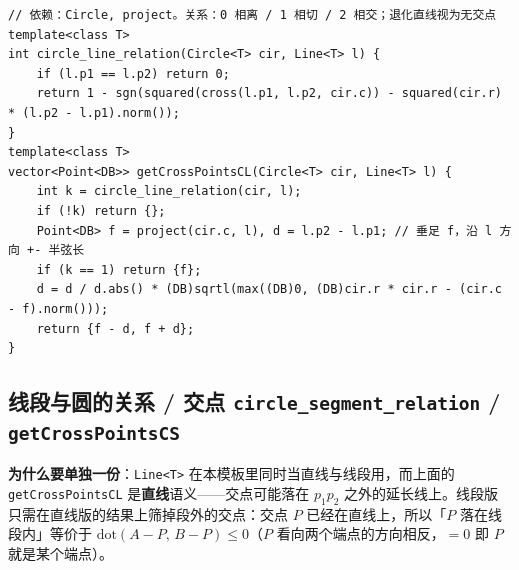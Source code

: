 \begin{verbatim}
// 依赖：Circle, project。关系：0 相离 / 1 相切 / 2 相交；退化直线视为无交点
template<class T>
int circle_line_relation(Circle<T> cir, Line<T> l) {
	if (l.p1 == l.p2) return 0;
	return 1 - sgn(squared(cross(l.p1, l.p2, cir.c)) - squared(cir.r) * (l.p2 - l.p1).norm());
}
template<class T>
vector<Point<DB>> getCrossPointsCL(Circle<T> cir, Line<T> l) {
	int k = circle_line_relation(cir, l);
	if (!k) return {};
	Point<DB> f = project(cir.c, l), d = l.p2 - l.p1; // 垂足 f，沿 l 方向 +- 半弦长
	if (k == 1) return {f};
	d = d / d.abs() * (DB)sqrtl(max((DB)0, (DB)cir.r * cir.r - (cir.c - f).norm()));
	return {f - d, f + d};
}
\end{verbatim}

		\subsection{线段与圆的关系 / 交点 \texttt{circle\_segment\_relation} / \texttt{getCrossPointsCS}}

		\textbf{为什么要单独一份}：\texttt{Line<T>} 在本模板里同时当直线与线段用，而上面的 \texttt{getCrossPointsCL} 是\textbf{直线}语义——交点可能落在 $p_1 p_2$ 之外的延长线上。线段版只需在直线版的结果上筛掉段外的交点：交点 $P$ 已经在直线上，所以「$P$ 落在线段内」等价于 $\mathrm{dot}(A - P,\, B - P) \le 0$（$P$ 看向两个端点的方向相反，$= 0$ 即 $P$ 就是某个端点）。

